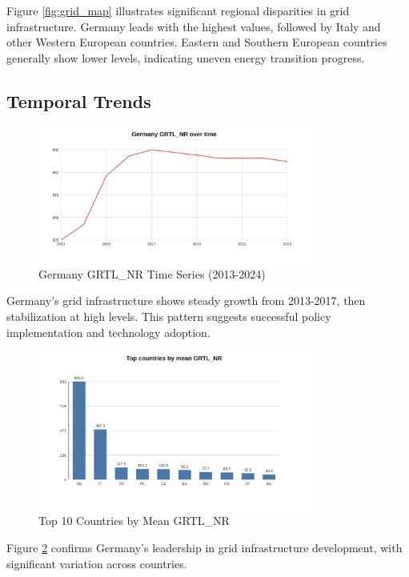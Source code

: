\documentclass[11pt,a4paper]{article}
\begin{document}
Figure \ref{fig:grid_map} illustrates significant regional disparities in grid infrastructure. Germany leads with the highest values, followed by Italy and other Western European countries. Eastern and Southern European countries generally show lower levels, indicating uneven energy transition progress.

\subsection{Temporal Trends}

\begin{figure}[H]
\centering
\includegraphics[width=0.8\textwidth]{assets/fig_de_grtl_timeseries.svg}
\caption{Germany GRTL\_NR Time Series (2013-2024)}
\label{fig:germany_trends}
\end{figure}

Germany's grid infrastructure shows steady growth from 2013-2017, then stabilization at high levels. This pattern suggests successful policy implementation and technology adoption.

\begin{figure}[H]
\centering
\includegraphics[width=0.8\textwidth]{assets/fig_top_countries_grtl.svg}
\caption{Top 10 Countries by Mean GRTL\_NR}
\label{fig:country_comparison}
\end{figure}

Figure \ref{fig:country_comparison} confirms Germany's leadership in grid infrastructure development, with significant variation across countries.
\end{document}
